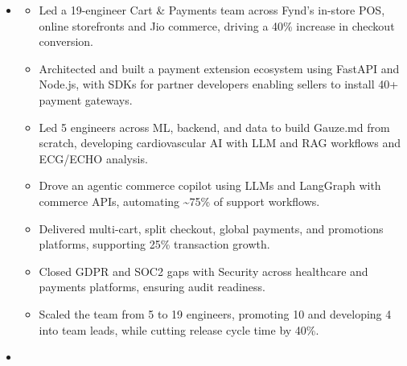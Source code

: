 \documentclass[11pt,a4paper,sans]{moderncv}
\begin{document}
\begin{itemize}
\item{
\vspace{-6pt}
{\small\begin{itemize}
    \item {Led a 19-engineer Cart \& Payments team across Fynd's in-store POS, online storefronts and Jio commerce, driving a 40\% increase in checkout conversion.}
    \item {Architected and built a payment extension ecosystem using FastAPI and Node.js, with SDKs for partner developers enabling sellers to install 40+ payment gateways.}
    \item {Led 5 engineers across ML, backend, and data to build Gauze.md from scratch, developing cardiovascular AI with LLM and RAG workflows and ECG/ECHO analysis.}
    \item {Drove an agentic commerce copilot using LLMs and LangGraph with commerce APIs, automating \textasciitilde{}75\% of support workflows.}
    \item {Delivered multi-cart, split checkout, global payments, and promotions platforms, supporting 25\% transaction growth.}
    \item {Closed GDPR and SOC2 gaps with Security across healthcare and payments platforms, ensuring audit readiness.}
    \item {Scaled the team from 5 to 19 engineers, promoting 10 and developing 4 into team leads, while cutting release cycle time by 40\%.}
\end{itemize}\par}}

\item[]{}


\end{itemize}
\end{document}
